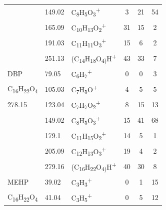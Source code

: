 {\begin{longtable}[c]{lllccc}
          & 149.02               & C\textsubscript{8}H\textsubscript{5}O\textsubscript{3}\textsuperscript{+}      & 3            & 21           & 54           \\
          & 165.09               & C\textsubscript{10}H\textsubscript{13}O\textsubscript{2}\textsuperscript{+}    & 31           & 15           & 2            \\
          & 191.03               & C\textsubscript{11}H\textsubscript{11}O\textsubscript{3}\textsuperscript{+}    & 15           & 6            & 2            \\
          & 251.13               & (C\textsubscript{14}H\textsubscript{18}O\textsubscript{4)}H\textsuperscript{+} & 43           & 33           & 7            \\
\hline
DBP                                                      & 79.05  & C\textsubscript{6}H\textsubscript{7}\textsuperscript{+}                        & 0  & 0  & 3  \\
C\textsubscript{16}H\textsubscript{22}O\textsubscript{4} & 105.03 & C\textsubscript{7}H\textsubscript{5}O\textsuperscript{+}                       & 4  & 5  & 5  \\
278.15                                                   & 123.04 & C\textsubscript{7}H\textsubscript{7}O\textsubscript{2}\textsuperscript{+}      & 8  & 15 & 13 \\
                                                         & 149.02 & C\textsubscript{8}H\textsubscript{5}O\textsubscript{3}\textsuperscript{+}      & 15 & 41 & 68 \\
                                                         & 179.1  & C\textsubscript{11}H\textsubscript{15}O\textsubscript{2}\textsuperscript{+}    & 14 & 5  & 1  \\
                                                         & 205.09 & C\textsubscript{12}H\textsubscript{13}O\textsubscript{3}\textsuperscript{+}    & 19 & 4  & 2  \\
                                                         & 279.16 & (C\textsubscript{16}H\textsubscript{22}O\textsubscript{4)}H\textsuperscript{+} & 40 & 30 & 8 \\
\hline
MEHP                                                     & 39.02  & C\textsubscript{3}H\textsubscript{3}\textsuperscript{+}                   & 0  & 1  & 15 \\
C\textsubscript{16}H\textsubscript{22}O\textsubscript{4} & 41.04  & C\textsubscript{3}H\textsubscript{5}\textsuperscript{+}                   & 0  & 5  & 12 \\

\end{longtable}}
